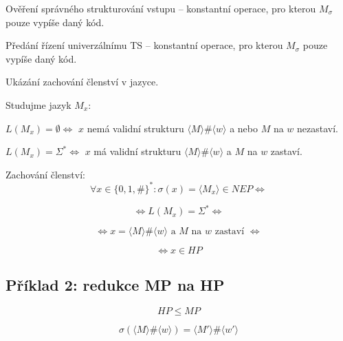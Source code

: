 \begin{compactitem}
\begin{compactenum}
        \item Ověření správného strukturování vstupu -- konstantní operace, pro kterou $M_{\sigma}$ pouze vypíše daný kód.

        \item Předání řízení univerzálnímu TS -- konstantní operace, pro kterou $M_{\sigma}$ pouze vypíše daný kód.
    \end{compactenum}

    \item Ukázání zachování členství v jazyce. \begin{compactitem}
        \item Studujme jazyk $M_x$: \begin{compactitem}
            \item $L(M_x) = \emptyset \Leftrightarrow$ $x$ nemá validní strukturu $\langle M \rangle \# \langle w \rangle$ a nebo $M$ na $w$ nezastaví.

            \item $L(M_x) = \Sigma^* \Leftrightarrow$ $x$ má validní strukturu $\langle M \rangle \# \langle w \rangle$ a $M$ na $w$ zastaví.
        \end{compactitem}
        \item Zachování členství:
            $$ \forall x \in \{ 0, 1, \# \}^* : \sigma(x) = \langle M_x \rangle \in NEP \Leftrightarrow $$

            $$ \Leftrightarrow L(M_x) = \Sigma^* \Leftrightarrow $$

            $$ \Leftrightarrow x = \langle M \rangle \# \langle w \rangle \text{ a } M \text{ na } w \text{ zastaví } \Leftrightarrow $$

            $$ \Leftrightarrow x \in HP $$
    \end{compactitem}

\end{compactitem}

\subsection*{Příklad 2: redukce MP na HP}

$$ HP \leq MP $$

$$ \sigma(\langle M \rangle \# \langle w \rangle) = \langle M' \rangle \# \langle w' \rangle$$

